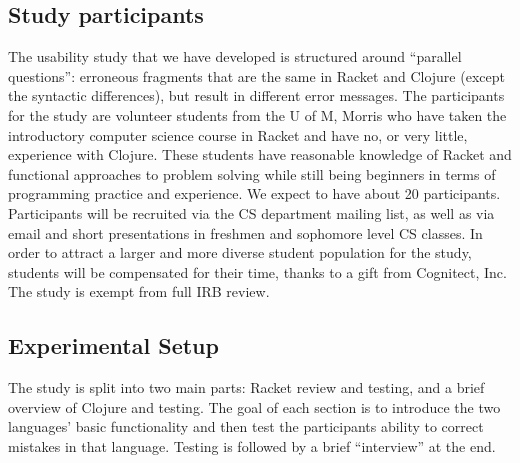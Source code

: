 \documentclass[12pt]{article}
\newcommand{\comment}[1]{{\bf \tt  {#1}}}
\newcommand{\thcomment}[1]{\textcolor{Coquelicot}{\comment{Thomas: {#1}}}}
\begin{document}
	\subsection{Study participants}\label{sec:obj}
The usability study that we have developed is structured around ``parallel questions'': erroneous fragments that are the same in 
Racket and Clojure (except the syntactic differences), but result in different error messages.  
The participants for the study are volunteer students from the U of M, Morris who have taken the introductory computer science course in Racket and have no, or very little, experience with Clojure.
These students have reasonable knowledge of Racket and functional approaches to problem solving while still being beginners in terms of programming practice and experience.
We expect to have about 20 participants. 
Participants will be recruited via the CS department mailing list, as well as via email and short presentations in freshmen and sophomore level CS classes. 
In order to attract a larger and more diverse student population for the study, students will be compensated for their time, thanks to a gift from Cognitect, Inc. 
The study is exempt from full IRB review. 

	\subsection{Experimental Setup}\label{sec:setup}
	
	   
The study is split into two main parts: Racket review and testing, and a brief overview of Clojure and testing.
The goal of each section is to introduce the two languages' basic functionality and then test the participants ability to correct mistakes in that language.
 Testing is followed by a brief ``interview'' at the end. 
\end{document}
